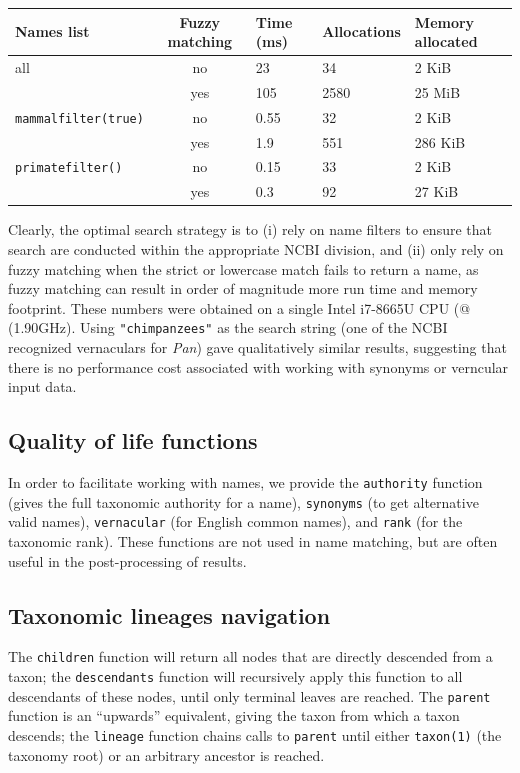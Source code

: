 \documentclass[10pt,oneside]{article}
\begin{document}
\begin{longtable}[]{@{}lclll@{}}
\toprule
Names list & Fuzzy matching & Time (ms) & Allocations & Memory
allocated\tabularnewline
\midrule
\endhead
all & no & 23 & 34 & 2 KiB\tabularnewline
& yes & 105 & 2580 & 25 MiB\tabularnewline
\texttt{mammalfilter(true)} & no & 0.55 & 32 & 2 KiB\tabularnewline
& yes & 1.9 & 551 & 286 KiB\tabularnewline
\texttt{primatefilter()} & no & 0.15 & 33 & 2 KiB\tabularnewline
& yes & 0.3 & 92 & 27 KiB\tabularnewline
\bottomrule
\end{longtable}

Clearly, the optimal search strategy is to (i) rely on name filters to
ensure that search are conducted within the appropriate NCBI division,
and (ii) only rely on fuzzy matching when the strict or lowercase match
fails to return a name, as fuzzy matching can result in order of
magnitude more run time and memory footprint. These numbers were
obtained on a single Intel i7-8665U CPU (@ (1.90GHz). Using
\texttt{"chimpanzees"} as the search string (one of the NCBI recognized
vernaculars for \emph{Pan}) gave qualitatively similar results,
suggesting that there is no performance cost associated with working
with synonyms or verncular input data.

\hypertarget{quality-of-life-functions}{%
\subsection{Quality of life functions}\label{quality-of-life-functions}}

In order to facilitate working with names, we provide the
\texttt{authority} function (gives the full taxonomic authority for a
name), \texttt{synonyms} (to get alternative valid names),
\texttt{vernacular} (for English common names), and \texttt{rank} (for
the taxonomic rank). These functions are not used in name matching, but
are often useful in the post-processing of results.

\hypertarget{taxonomic-lineages-navigation}{%
\subsection{Taxonomic lineages
navigation}\label{taxonomic-lineages-navigation}}

The \texttt{children} function will return all nodes that are directly
descended from a taxon; the \texttt{descendants} function will
recursively apply this function to all descendants of these nodes, until
only terminal leaves are reached. The \texttt{parent} function is an
``upwards'' equivalent, giving the taxon from which a taxon descends;
the \texttt{lineage} function chains calls to \texttt{parent} until
either \texttt{taxon(1)} (the taxonomy root) or an arbitrary ancestor is
reached.
\end{document}
